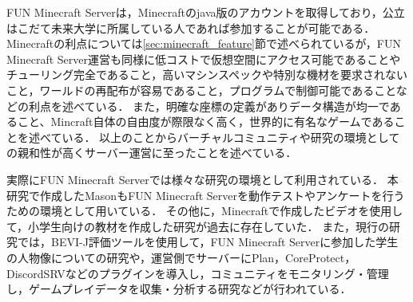 FUN Minecraft Serverは，Minecraftのjava版のアカウントを取得しており，公立はこだて未来大学に所属している人であれば参加することが可能である．
Minecraftの利点については\ref{sec:minecraft_feature}節で述べられているが，FUN Minecraft Server運営も同様に低コストで仮想空間にアクセス可能であることやチューリング完全であること，高いマシンスペックや特別な機材を要求されないこと，ワールドの再配布が容易であること，プログラムで制御可能であることなどの利点を述べている．
また，明確な座標の定義がありデータ構造が均一であること、Mincraft自体の自由度が際限なく高く，世界的に有名なゲームであることを述べている．
以上のことからバーチャルコミュニティや研究の環境としての親和性が高くサーバー運営に至ったことを述べている．

実際にFUN Minecraft Serverでは様々な研究の環境として利用されている\cite{bib:fun_minecraft_server,bib:fun_minecraft_server_research}．
本研究で作成したMasonもFUN Minecraft Serverを動作テストやアンケートを行うための環境として用いている．
その他に，Minecraftで作成したビデオを使用して，小学生向けの教材を作成した研究が過去に存在していた．
また，現行の研究では，BEVI-J評価ツールを使用して，FUN Minecraft Serverに参加した学生の人物像についての研究や，運営側でサーバーにPlan，CoreProtect，DiscordSRVなどのプラグインを導入し，コミュニティをモニタリング・管理し，ゲームプレイデータを収集・分析する研究などが行われている．